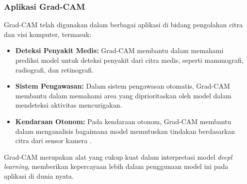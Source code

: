 \subsubsection{Aplikasi Grad-CAM}

Grad-CAM telah digunakan dalam berbagai aplikasi di bidang pengolahan citra dan visi komputer, termasuk:

\begin{itemize}
    \item \textbf{Deteksi Penyakit Medis:} Grad-CAM membantu dalam memahami prediksi model untuk deteksi penyakit dari citra medis, seperti mammografi, radiografi, dan retinografi.
    \item \textbf{Sistem Pengawasan:} Dalam sistem pengawasan otomatis, Grad-CAM membantu dalam memahami area yang diprioritaskan oleh model dalam mendeteksi aktivitas mencurigakan.
    \item \textbf{Kendaraan Otonom:} Pada kendaraan otonom, Grad-CAM membantu dalam menganalisis bagaimana model memutuskan tindakan berdasarkan citra dari sensor kamera \parencite{selvaraju2017grad}.
\end{itemize}

Grad-CAM merupakan alat yang cukup kuat dalam interpretasi model \emph{deepl learning}, memberikan kepercayaan lebih dalam penggunaan model ini pada aplikasi di dunia nyata.


